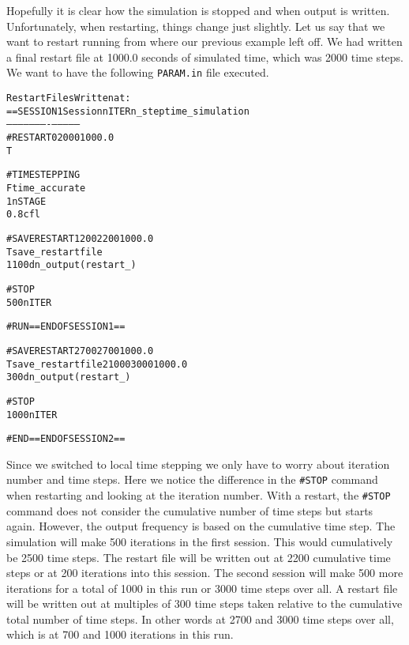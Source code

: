 Hopefully it is clear how the simulation is stopped and when output is written.
Unfortunately, when restarting, things change just slightly. 
Let us say that we want to restart running from where our previous example left off.
We had written a final restart file at 1000.0 seconds of simulated time, which
was 2000 time steps.  We want to have the following {\tt PARAM.in} file
executed. 
\begin{alltt}
                                             Restart Files Written at:
==SESSION 1      \hfill        Session   nITER   n_step   time_simulation
                 \hfill        --------  ------  -------  --------------
#RESTART                         \hfill            0     2000           1000.0
T

#TIMESTEPPING
F       time_accurate  
1       nSTAGE         
0.8     cfl            

#SAVERESTART                      \hfill  1       200     2200           1000.0
T            save_restartfile
1100         dn_output(restart_)

#STOP
500          nITER

#RUN ==END OF SESSION 1== 

#SAVERESTART                      \hfill  2       700     2700           1000.0
T           save_restartfile	  \hfill  2      1000     3000           1000.0
300         dn_output(restart_)

#STOP
1000        nITER

#END ==END OF SESSION 2== 
                          
\end{alltt}
Since we switched to local time stepping we only have to worry about iteration
number and time steps.  Here we notice the difference in the {\tt \#STOP} command when
restarting and looking at the iteration number.  With a restart, 
the {\tt \#STOP} command does not consider the cumulative number of time steps but starts
again.  However, the output frequency is based on the cumulative time step.  
The simulation will make 500 iterations
in the first session.  This would cumulatively be 2500 time steps.  The restart
file will be written out at 2200 cumulative time steps or at 200 iterations into this
session.  The second session will make 500 more iterations for a total of 1000
in this run or 3000 time steps over all.  A restart file will be written out at multiples
of 300 time steps taken relative to the cumulative total number of time steps.  In other
words at 2700 and 3000 time steps over all, which is at 700 and 1000 iterations in
this run.

